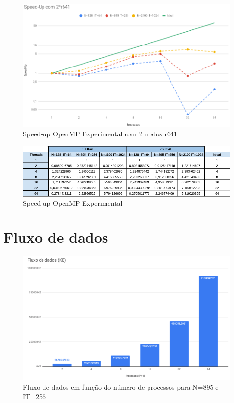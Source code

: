 \documentclass{article}
\begin{document}
\begin{appendices}
\begin{figure}[H]
    \centering
    \includegraphics[width=16cm]{Pictures/OpenMP2.png}
    \caption{Speed-up OpenMP Experimental com 2 nodos r641}
\end{figure}

\begin{figure}[H]
    \centering
    \includegraphics[width=18cm]{Pictures/OpenMPTable.png}
    \caption{Speed-up OpenMP Experimental}
\end{figure}

\section{Fluxo de dados}
\label{data_flux}
\begin{figure}[H]
    \centering
    \includegraphics[width=15cm]{Pictures/DataFlux.png}
    \caption{Fluxo de dados em função do número de processos para N=895 e IT=256}
\end{figure}


\end{appendices}
\end{document}
